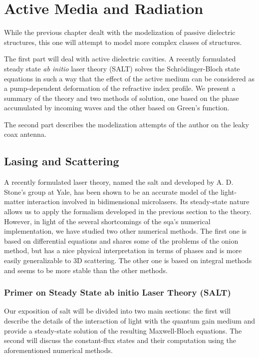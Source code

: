 \chapter{Active Media and Radiation}
While the previous chapter dealt with the modelization
of passive dielectric structures, this one will attempt
to model more complex classes of structures. 

The first part will
deal with active dielectric cavities. A recently formulated
steady state \textit{ab initio} laser theory (SALT) solves the 
Schrödinger-Bloch state equations in such a way that the effect of
the active medium can be considered as a pump-dependent
deformation of the refractive index profile. We present a summary 
of the theory and two methods of solution, one based on the phase
accumulated by incoming waves and the other based on Green's
function. 

The second part describes the modelization attempts
of the author on the leaky coax antenna. 

\section{Lasing and Scattering}
A recently formulated laser theory, named the 
\gls{salt} and developed by A. D. Stone's group
at Yale, has been shown to be an accurate model 
of the light-matter interaction involved in bidimensional
microlasers. Its steady-state nature allows us to apply
the formalism developed in the previous section 
to the theory. However, in light of the several shortcomings
of the \gls{sqa}'s numerical implementation, we have studied 
two other numerical methods. The first one is based on 
differential equations and shares some of the problems of 
the onion method, but has a nice physical interpretation
in terms of phases and is more easily generalizable to 
3D scattering. The other one is based on integral methods 
and seems to be more stable than the other methods.

\subsection{Primer on Steady State ab initio Laser Theory (SALT)}
Our exposition of \gls{salt} will be divided into two main sections:
the first will describe the details of the interaction of light with
the quantum gain medium and provide a steady-state solution
of the resulting Maxwell-Bloch equations. The second
will discuss the constant-flux states and their computation
using the aforementioned numerical methods. 

